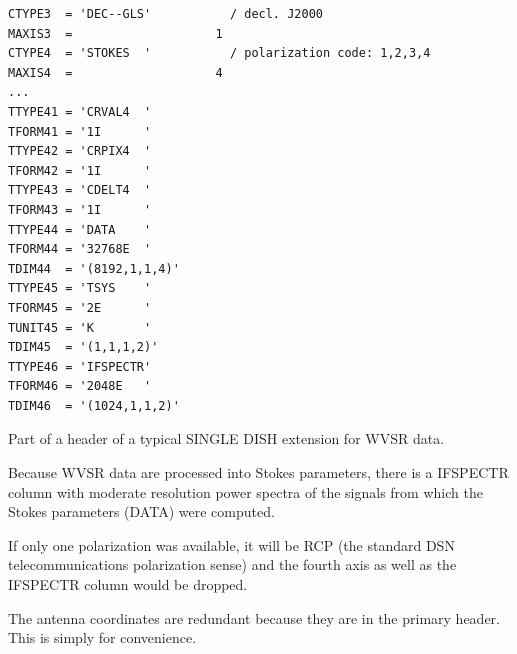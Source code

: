 \documentclass[letterpaper,11pt]{book}
\begin{document}
\begin{code}[h!]
\begin{center}
{\begin{verbatim}
CTYPE3  = 'DEC--GLS'           / decl. J2000                                    
MAXIS3  =                    1                                                  
CTYPE4  = 'STOKES  '           / polarization code: 1,2,3,4                     
MAXIS4  =                    4                                                                                                                                                          
...                                                    
TTYPE41 = 'CRVAL4  '                                                            
TFORM41 = '1I      '                                                            
TTYPE42 = 'CRPIX4  '                                                            
TFORM42 = '1I      '                                                            
TTYPE43 = 'CDELT4  '                                                            
TFORM43 = '1I      '                                                            
TTYPE44 = 'DATA    '                                                            
TFORM44 = '32768E  '                                                            
TDIM44  = '(8192,1,1,4)'                                                        
TTYPE45 = 'TSYS    '                                                            
TFORM45 = '2E      '                                                            
TUNIT45 = 'K       '                                                            
TDIM45  = '(1,1,1,2)'                                                           
TTYPE46 = 'IFSPECTR'                                                            
TFORM46 = '2048E   '                                                            
TDIM46  = '(1024,1,1,2)'\end{verbatim}
}\caption{\label{cod:tb-header}Part of a header of a typical SINGLE DISH 
extension for WVSR data.}
\end{center}
\end{code}
Because WVSR data are processed into Stokes parameters, there is a
{\ttfamily IFSPECTR} column with moderate resolution power spectra of
the signals from which the Stokes parameters ({\ttfamily DATA}) were computed.

If only one polarization was available, it will be RCP (the standard DSN
telecommunications polarization sense) and the fourth axis as
well as the {\ttfamily IFSPECTR} column would be dropped.

The antenna coordinates are redundant because they are in the primary header.
This is simply for convenience.
\end{document}
